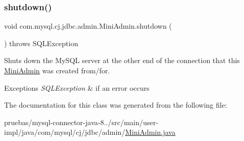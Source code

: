 \subsubsection{\texorpdfstring{shutdown()}{shutdown()}}
{\footnotesize\ttfamily void com.\+mysql.\+cj.\+jdbc.\+admin.\+Mini\+Admin.\+shutdown (\begin{DoxyParamCaption}{ }\end{DoxyParamCaption}) throws S\+Q\+L\+Exception}

Shuts down the My\+S\+QL server at the other end of the connection that this \mbox{\hyperlink{classcom_1_1mysql_1_1cj_1_1jdbc_1_1admin_1_1_mini_admin}{Mini\+Admin}} was created from/for.


\begin{DoxyExceptions}{Exceptions}
{\em S\+Q\+L\+Exception} & if an error occurs \\
\hline
\end{DoxyExceptions}


The documentation for this class was generated from the following file\+:\begin{DoxyCompactItemize}
\item 
pruebas/mysql-\/connector-\/java-\/8../src/main/user-\/impl/java/com/mysql/cj/jdbc/admin/\mbox{\hyperlink{_mini_admin_8java}{Mini\+Admin.\+java}}\end{DoxyCompactItemize}
